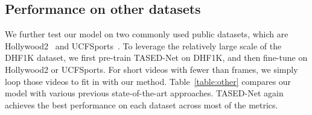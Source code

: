 \documentclass[10pt,twocolumn,letterpaper]{article}
\newcommand{\modelname}{TASED-Net}
\begin{document}
\begin{table}[!t]
\subsection{Performance on other datasets} \label{subsec:on-other}
We further test our model on two commonly used public datasets, which are Hollywood2~\cite{marszalek2009actions, mathe2015actions} and UCFSports~\cite{mathe2015actions, rodriguez2008action, soomro2014action}. To leverage the relatively large scale of the DHF1K dataset, we first pre-train \modelname{} on DHF1K, and then fine-tune on Hollywood2 or UCFSports. For short videos with fewer than  frames, we simply loop those videos to fit in with our method. Table~\ref{table:other} compares our model with various previous state-of-the-art approaches. \modelname{} again achieves the best performance on each dataset across most of the metrics.


\end{table}
\end{document}
